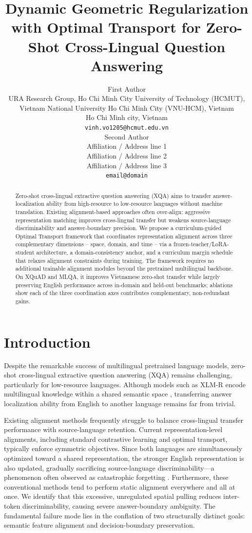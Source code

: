 \documentclass[11pt]{article}
\title{Dynamic Geometric Regularization with Optimal Transport for Zero-Shot Cross-Lingual Question Answering}
\author{First Author \\
  URA Research Group, Ho Chi Minh City University of Technology (HCMUT), Vietnam National University Ho Chi Minh City (VNU-HCM), Vietnam \\
  Ho Chi Minh city, Vietnam \\
  \texttt{vinh.vo1205@hcmut.edu.vn} \\\And
  Second Author \\
  Affiliation / Address line 1 \\
  Affiliation / Address line 2 \\
  Affiliation / Address line 3 \\
  \texttt{email@domain} \\}
\begin{document}
\maketitle
\begin{abstract}

Zero-shot cross-lingual extractive question answering (XQA) aims to transfer answer-localization ability from high-resource to low-resource languages without machine translation. Existing alignment-based approaches often over-align: aggressive representation matching improves cross-lingual transfer but weakens source-language discriminability and answer-boundary precision. We propose a curriculum-guided Optimal Transport framework that coordinates representation alignment across three complementary dimensions -- space, domain, and time -- via a frozen-teacher/LoRA-student architecture, a domain-consistency anchor, and a curriculum margin schedule that relaxes alignment constraints during training. The framework requires no additional trainable alignment modules beyond the pretrained multilingual backbone. On XQuAD and MLQA, it improves Vietnamese zero-shot transfer while largely preserving English performance across in-domain and held-out benchmarks; ablations show each of the three coordination axes contributes complementary, non-redundant gains.

\end{abstract}

\section{Introduction}
Despite the remarkable success of multilingual pretrained language models, zero-shot cross-lingual extractive question answering (XQA) remains challenging, particularly for low-resource languages. Although models such as XLM-R encode multilingual knowledge within a shared semantic space \cite{wu-dredze-2019-beto}, transferring answer localization ability from English to another language remains far from trivial.

Existing alignment methods frequently struggle to balance cross-lingual transfer performance with source-language retention. Current representation-level alignments, including standard contrastive learning and optimal transport, typically enforce symmetric objectives. Since both languages are simultaneously optimized toward a shared representation, the stronger English representation is also updated, gradually sacrificing source-language discriminability—a phenomenon often observed as catastrophic forgetting \cite{koloski2025measuringcatastrophicforgettingcrosslingual}. Furthermore, these conventional methods tend to perform static alignment everywhere and all at once. We identify that this excessive, unregulated spatial pulling reduces inter-token discriminability, causing severe answer-boundary ambiguity. The fundamental failure mode lies in the conflation of two structurally distinct goals: semantic feature alignment and decision-boundary preservation.
\end{document}
